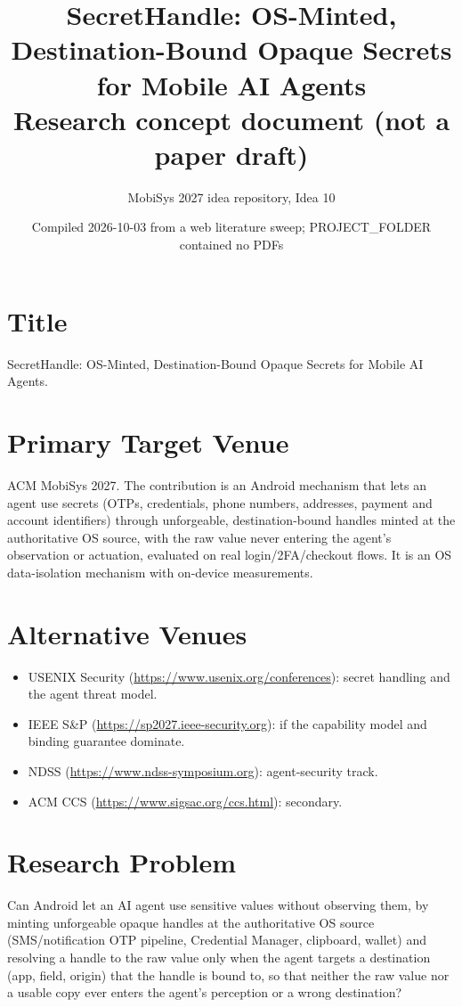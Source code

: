 \documentclass[11pt]{article}
\title{SecretHandle: OS-Minted, Destination-Bound Opaque Secrets for Mobile AI Agents\\
\large Research concept document (not a paper draft)}
\author{MobiSys 2027 idea repository, Idea 10}
\date{Compiled 2026-10-03 from a web literature sweep; PROJECT\_FOLDER contained no PDFs}
\begin{document}
\maketitle

\section{Title}
SecretHandle: OS-Minted, Destination-Bound Opaque Secrets for Mobile AI Agents.

\section{Primary Target Venue}
ACM MobiSys 2027. The contribution is an Android mechanism that lets an agent use secrets (OTPs, credentials, phone numbers, addresses, payment and account identifiers) through unforgeable, destination-bound handles minted at the authoritative OS source, with the raw value never entering the agent's observation or actuation, evaluated on real login/2FA/checkout flows. It is an OS data-isolation mechanism with on-device measurements.

\section{Alternative Venues}
\begin{itemize}
  \item USENIX Security (\url{https://www.usenix.org/conferences}): secret handling and the agent threat model.
  \item IEEE S\&P (\url{https://sp2027.ieee-security.org}): if the capability model and binding guarantee dominate.
  \item NDSS (\url{https://www.ndss-symposium.org}): agent-security track.
  \item ACM CCS (\url{https://www.sigsac.org/ccs.html}): secondary.
\end{itemize}

\section{Research Problem}
Can Android let an AI agent use sensitive values without observing them, by minting unforgeable opaque handles at the authoritative OS source (SMS/notification OTP pipeline, Credential Manager, clipboard, wallet) and resolving a handle to the raw value only when the agent targets a destination (app, field, origin) that the handle is bound to, so that neither the raw value nor a usable copy ever enters the agent's perception or a wrong destination?
\end{document}
